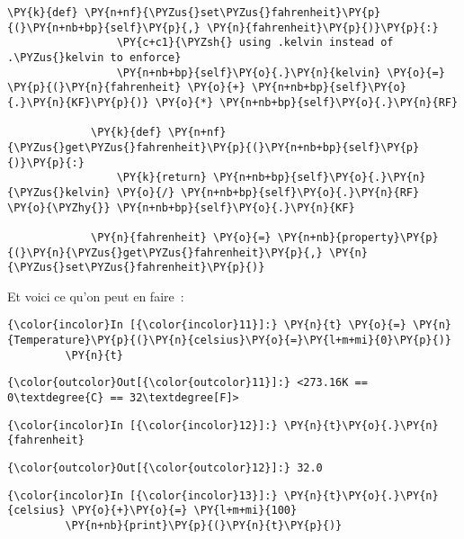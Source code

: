 \begin{Verbatim}[commandchars=\\\{\}]
             \PY{k}{def} \PY{n+nf}{\PYZus{}set\PYZus{}fahrenheit}\PY{p}{(}\PY{n+nb+bp}{self}\PY{p}{,} \PY{n}{fahrenheit}\PY{p}{)}\PY{p}{:}
                 \PY{c+c1}{\PYZsh{} using .kelvin instead of .\PYZus{}kelvin to enforce}
                 \PY{n+nb+bp}{self}\PY{o}{.}\PY{n}{kelvin} \PY{o}{=} \PY{p}{(}\PY{n}{fahrenheit} \PY{o}{+} \PY{n+nb+bp}{self}\PY{o}{.}\PY{n}{KF}\PY{p}{)} \PY{o}{*} \PY{n+nb+bp}{self}\PY{o}{.}\PY{n}{RF}
         
             \PY{k}{def} \PY{n+nf}{\PYZus{}get\PYZus{}fahrenheit}\PY{p}{(}\PY{n+nb+bp}{self}\PY{p}{)}\PY{p}{:}
                 \PY{k}{return} \PY{n+nb+bp}{self}\PY{o}{.}\PY{n}{\PYZus{}kelvin} \PY{o}{/} \PY{n+nb+bp}{self}\PY{o}{.}\PY{n}{RF} \PY{o}{\PYZhy{}} \PY{n+nb+bp}{self}\PY{o}{.}\PY{n}{KF}
             
             \PY{n}{fahrenheit} \PY{o}{=} \PY{n+nb}{property}\PY{p}{(}\PY{n}{\PYZus{}get\PYZus{}fahrenheit}\PY{p}{,} \PY{n}{\PYZus{}set\PYZus{}fahrenheit}\PY{p}{)}
\end{Verbatim}


    Et voici ce qu'on peut en faire~:

    \begin{Verbatim}[commandchars=\\\{\}]
{\color{incolor}In [{\color{incolor}11}]:} \PY{n}{t} \PY{o}{=} \PY{n}{Temperature}\PY{p}{(}\PY{n}{celsius}\PY{o}{=}\PY{l+m+mi}{0}\PY{p}{)}
         \PY{n}{t}
\end{Verbatim}


\begin{Verbatim}[commandchars=\\\{\}]
{\color{outcolor}Out[{\color{outcolor}11}]:} <273.16K == 0\textdegree{C} == 32\textdegree[F]>
\end{Verbatim}
            
    \begin{Verbatim}[commandchars=\\\{\}]
{\color{incolor}In [{\color{incolor}12}]:} \PY{n}{t}\PY{o}{.}\PY{n}{fahrenheit}
\end{Verbatim}


\begin{Verbatim}[commandchars=\\\{\}]
{\color{outcolor}Out[{\color{outcolor}12}]:} 32.0
\end{Verbatim}
            
    \begin{Verbatim}[commandchars=\\\{\}]
{\color{incolor}In [{\color{incolor}13}]:} \PY{n}{t}\PY{o}{.}\PY{n}{celsius} \PY{o}{+}\PY{o}{=} \PY{l+m+mi}{100}
         \PY{n+nb}{print}\PY{p}{(}\PY{n}{t}\PY{p}{)}
\end{Verbatim}


